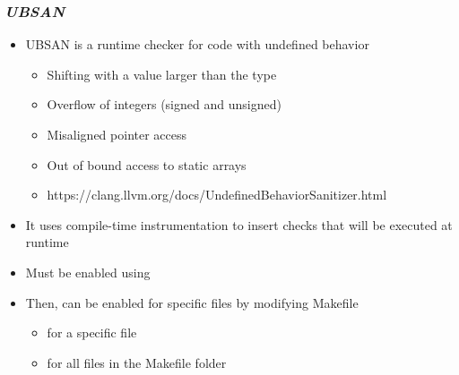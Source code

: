 \begin{frame}
  \frametitle{{\em UBSAN}}
  \begin{itemize}
    \item UBSAN is a runtime checker for code with undefined behavior
    \begin{itemize}
      \item Shifting with a value larger than the type
      \item Overflow of integers (signed and unsigned)
      \item Misaligned pointer access
      \item Out of bound access to static arrays
      \item https://clang.llvm.org/docs/UndefinedBehaviorSanitizer.html
    \end{itemize}
    \item It uses compile-time instrumentation to insert checks that will be
          executed at runtime
    \item Must be enabled using 
    \item Then, can be enabled for specific files by modifying Makefile
    \begin{itemize}
      \item {} for a specific file
      \item {} for all files in the Makefile folder
    \end{itemize}
  \end{itemize}
\end{frame}

